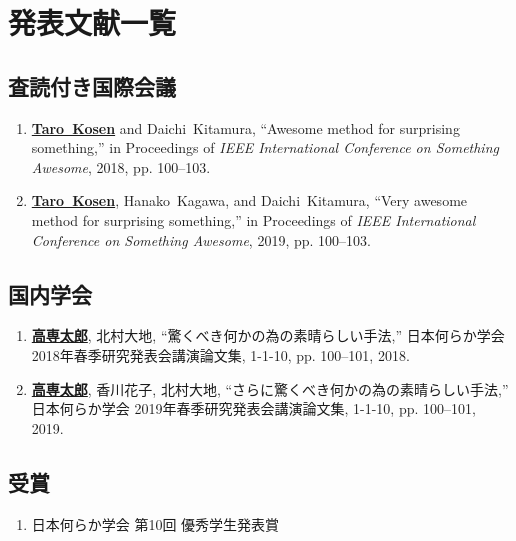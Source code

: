 {
\chapter*{発表文献一覧}
\newcommand{\myname}[1]{\textbf{\underline{#1}}}

\section*{査読付き国際会議}
\begin{enumerate}
  \item \myname{Taro~Kosen} and Daichi~Kitamura,
    ``Awesome method for surprising something,'' 
    in Proceedings of \emph{{IEEE} International Conference on Something Awesome}, 
    2018, pp. 100--103.
  \item \myname{Taro~Kosen}, Hanako~Kagawa, and Daichi~Kitamura,
    ``Very awesome method for surprising something,'' 
    in Proceedings of \emph{{IEEE} International Conference on Something Awesome}, 
    2019, pp. 100--103.
\end{enumerate}


\section*{国内学会}
\begin{enumerate}
  \item  \myname{高専太郎}, 北村大地, 
    ``驚くべき何かの為の素晴らしい手法,''
    日本何らか学会 2018年春季研究発表会講演論文集, 1-1-10, pp. 100--101, 2018.
  \item  \myname{高専太郎}, 香川花子, 北村大地, 
    ``さらに驚くべき何かの為の素晴らしい手法,''
    日本何らか学会 2019年春季研究発表会講演論文集, 1-1-10, pp. 100--101, 2019.
\end{enumerate}


\section*{受賞}
\begin{enumerate}
  \item 日本何らか学会 第10回 優秀学生発表賞
\end{enumerate}
}
